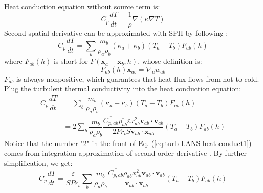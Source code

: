 Heat conduction equation without source term is:
\begin{equation}
C_p \dfrac{dT}{dt} = \dfrac{1}{\rho} \nabla \left(\kappa \nabla T\right)
\end{equation}
Second spatial derivative can be approximated with SPH by following \citet{monaghan2005smoothed}: 
\begin{equation}
C_p \dfrac{dT}{dt} = \sum_b \dfrac{m_b}{\rho_a \rho_b} \left(\kappa_a + \kappa_b\right) \left(T_a - T_b\right) F_{ab} \left(h\right)
\end{equation}
where $F_{ab} (h)$ is short for $F \left( \textbf{x}_a - \textbf{x}_b, h \right)$, whose definition is:
\begin{equation}
F_{ab}(h) \textbf{x}_{ab} = \nabla _a w_{ab}
\end{equation}
$F_{ab}$ is always nonpositive, which guarantees that heat flux flows from hot to cold. 
Plug the turbulent thermal conductivity into the heat conduction equation:
\begin{equation}
\begin{split}
C_p \dfrac{dT}{dt}
& = \sum_b \dfrac{m_b}{\rho_a \rho_b} \left(\kappa_a + \kappa_b\right) \left(T_a - T_b\right) F_{ab} \left(h\right) \\
 &= 2 \sum_b \dfrac{m_b}{\rho_a \rho_b} \dfrac{\overline{C_{p,ab}} \overline{\rho_{ab}} \varepsilon x_{ab}^2 \textbf{v}_{ab} \cdot \textbf{v}_{ab}}{2 Pr_t  S \textbf{v}_{ab} \cdot \textbf{x}_{ab} } \left(T_a - T_b\right) F_{ab} \left(h\right)
\end{split}
\label{eq:turb-LANS-heat-conduct1}
\end{equation}
Notice that the number "2" in the front of Eq. (\ref{eq:turb-LANS-heat-conduct1}) comes from integration approximation of second order derivative \citep {cleary1999conduction}. By further simplification, we get:
\begin{equation}
C_p \dfrac{dT}{dt}
 =\dfrac{\varepsilon}{S  Pr_t}  \sum_b \dfrac{m_b}{\rho_a \rho_b} \dfrac{\overline{C_{p,ab}} \overline{\rho_{ab}} x_{ab}^2 \textbf{v}_{ab} \cdot \textbf{v}_{ab}}{\textbf{v}_{ab} \cdot \textbf{x}_{ab}} \left(T_a - T_b\right) F_{ab} \left(h\right)
\end{equation}

